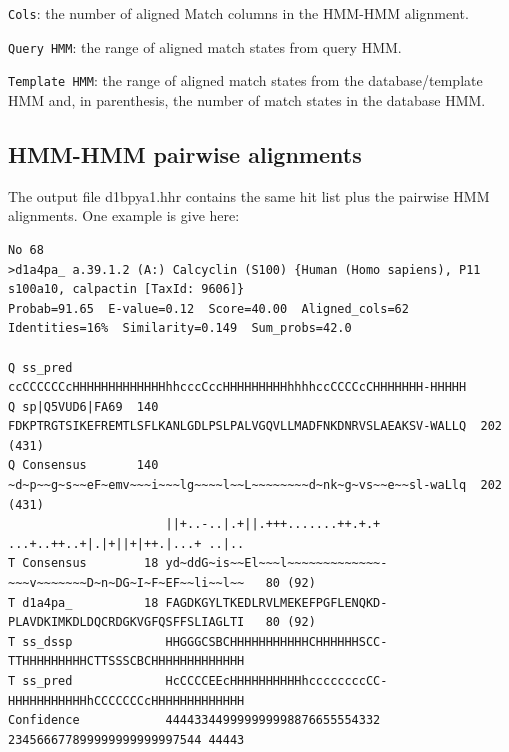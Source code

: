 \documentclass[11pt,a4paper]{article}
\begin{document}
\begin{description}
\item{\verb`Cols`}: the number of aligned Match columns in the HMM-HMM alignment.

\item{\verb`Query HMM`}: the range of aligned match states from query HMM.

\item{\verb`Template HMM`}: the range of aligned match states from the database/template HMM and, 
in parenthesis, the number of match states in the database HMM.

\end{description}



\subsection{HMM-HMM pairwise alignments}\label{aliblocksformat}

The output file d1bpya1.hhr contains the same hit list plus the pairwise HMM alignments. One example is give here:

\scriptsize
\begin{verbatim}
No 68 
>d1a4pa_ a.39.1.2 (A:) Calcyclin (S100) {Human (Homo sapiens), P11 s100a10, calpactin [TaxId: 9606]}
Probab=91.65  E-value=0.12  Score=40.00  Aligned_cols=62  Identities=16%  Similarity=0.149  Sum_probs=42.0

Q ss_pred             ccCCCCCCcHHHHHHHHHHHHHhhcccCccHHHHHHHHHhhhhccCCCCcCHHHHHHH-HHHHH
Q sp|Q5VUD6|FA69  140 FDKPTRGTSIKEFREMTLSFLKANLGDLPSLPALVGQVLLMADFNKDNRVSLAEAKSV-WALLQ  202 (431)
Q Consensus       140 ~d~p~~g~s~~eF~emv~~~i~~~lg~~~~l~~L~~~~~~~~d~nk~g~vs~~e~~sl-waLlq  202 (431)
                      ||+..-..|.+||.+++.......++.+.+ ...+..++..+|.|+||+|++.|...+ ..|..
T Consensus        18 yd~ddG~is~~El~~~l~~~~~~~~~~~~~-~~~v~~~~~~~D~n~DG~I~F~EF~~li~~l~~   80 (92)
T d1a4pa_          18 FAGDKGYLTKEDLRVLMEKEFPGFLENQKD-PLAVDKIMKDLDQCRDGKVGFQSFFSLIAGLTI   80 (92)
T ss_dssp             HHGGGCSBCHHHHHHHHHHHCHHHHHHSCC-TTHHHHHHHHHCTTSSSCBCHHHHHHHHHHHHH
T ss_pred             HcCCCCEEcHHHHHHHHHHhccccccccCC-HHHHHHHHHHHhCCCCCCCcHHHHHHHHHHHHH
Confidence            444433449999999998876655554332 234566677899999999999997544 44443
\end{verbatim}\normalsize
\end{document}
